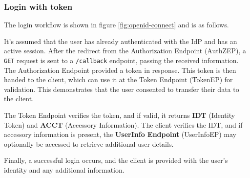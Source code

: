 \subsubsection{Login with token}
The login workflow is shown in figure \ref{fig:openid-connect} and is 
as follows.

It's assumed that the user has already authenticated with the IdP and 
has an active session.
After the redirect from the Authorization Endpoint (AuthZEP), a 
\texttt{GET} request is sent to a \texttt{/callback} endpoint, passing 
the received information. The Authorization Endpoint provided a token 
in response. This token is then handed to the client, which can use it 
at the Token Endpoint (TokenEP) for validation. This demonstrates that 
the user consented to transfer their data to the client. 

The Token Endpoint verifies the token, and if valid, it returns 
\textbf{IDT} (Identity Token) and \textbf{ACCT} (Accessory Information). 
The client verifies the IDT, and if accessory information is present, 
the \textbf{UserInfo Endpoint} (UserInfoEP) may optionally be accessed 
to retrieve additional user details. 

Finally, a successful login occurs, and the client is provided with 
the user's identity and any additional information.

